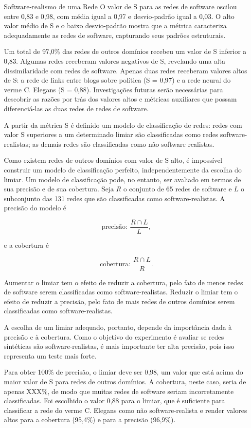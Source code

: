 \begin{section}{Software-realismo de uma Rede}
O valor de S para as redes de software oscilou entre 0,83 e 0,98, com média igual a 0,97 e desvio-padrão igual a 0,03. O alto valor médio de S e o baixo desvio-padrão mostra que a métrica caracteriza adequadamente as redes de software, capturando seus padrões estruturais.

Um total de 97,0\% das redes de outros domínios recebeu um valor de S inferior a 0,83. Algumas redes receberam valores negativos de S, revelando uma alta dissimilaridade com redes de software. Apenas duas redes receberam valores altos de S: a rede de links entre blogs sobre política (S = 0,97) e a rede neural do verme C. Elegans (S = 0,88). Investigações futuras serão necessárias para descobrir as razões por trás dos valores altos e métricas auxiliares que possam diferenciá-las as duas redes de redes de software.

A partir da métrica S é definido um modelo de classificação de redes: redes com valor S superiores a um determinado limiar são classificadas como redes software-realistas; as demais redes são classificadas como não software-realistas.

Como existem redes de outros domínios com valor de S alto, é impossível construir um modelo de classificação perfeito, independentemente da escolha do limiar. Um modelo de classificação pode, no entanto, ser avaliado em termos de sua precisão e de sua cobertura. Seja $R$ o conjunto de 65 redes de software e $L$ o subconjunto das 131 redes que são classificadas como software-realistas. A precisão do modelo é

$$
\mbox{precisão}: ~\frac{R \cap L}{L},
$$ %

e a cobertura é

$$
\mbox{cobertura}: ~\frac{R \cap L}{R}.
$$

Aumentar o limiar tem o efeito de reduzir a cobertura, pelo fato de menos redes de software serem classificadas como software-realistas. Reduzir o limiar tem o efeito de reduzir a precisão, pelo fato de mais redes de outros domínios serem classificadas como software-realistas.

A escolha de um limiar adequado, portanto, depende da importância dada à precisão e à cobertura. Como o objetivo do experimento é avaliar se redes sintéticas são software-realistas, é mais importante ter alta precisão, pois isso representa um teste mais forte.

Para obter 100\% de precisão, o limiar deve ser 0,98, um valor que está acima do maior valor de S para redes de outros domínios. A cobertura, neste caso, seria de apenas XXX\%, de modo que muitas redes de software seriam incorretamente classificadas. Foi escolhido o valor 0,88 para o limiar, que é suficiente para classificar a rede do verme C. Elegans como não software-realista e render valores altos para a cobertura (95,4\%) e para a precisão (96,9\%).

\end{section}

